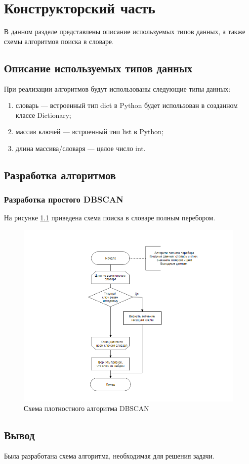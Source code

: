 \chapter{Конструкторский часть}

В данном разделе представлены описание используемых типов данных, а также схемы алгоритмов поиска в словаре.

\section{Описание используемых типов данных}
При реализации алгоритмов будут использованы следующие типы данных:
\begin{enumerate}[label=\arabic*)]
	\item словарь --- встроенный тип dict \cite{pythondict} в Python\cite{pythonlang} будет использован в созданном классе Dictionary;
	\item массив ключей --- встроенный тип list \cite{pythonlist} в Python\cite{pythonlang};
	\item длина массива/словаря --- целое число int.
\end{enumerate}

\section{Разработка алгоритмов}

\subsection{Разработка простого DBSCAN}
 
На рисунке \ref{fig:alg} приведена схема поиска в словаре полным перебором.


\begin{figure}[ht!]
	\centering
	\includegraphics[width=1\linewidth]{assets/graphs/full_comb.png}
	\caption{Схема плотностного алгоритма DBSCAN}
	\label{fig:alg}
\end{figure}

\newpage
\section*{Вывод}

Была разработана схема алгоритма, необходимая для решения задачи.